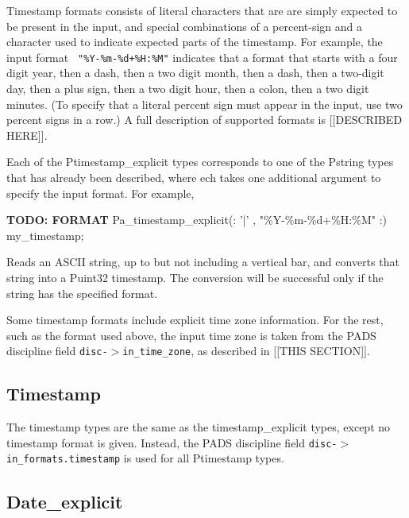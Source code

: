 Timestamp formats consists of literal characters that are are simply
expected to be present in the input, and special combinations of a
percent-sign and a character used to indicate expected parts of the
timestamp.  For example, the input format {\tt
"\%Y-\%m-\%d+\%H:\%M"} indicates that a format that starts with a
four digit year, then a dash, then a two digit month, then a dash,
then a two-digit day, then a plus sign, then a two digit hour, then a
colon, then a two digit minutes.  (To specify that a literal percent
sign must appear in the input, use two percent signs in a row.)  A
full description of supported formats is [[DESCRIBED HERE]].

Each of the Ptimestamp\_explicit types corresponds to one of the Pstring
types that has already been described, where ech takes one additional argument
to specify the input format.  For example,
\begin{tinycodeaux}{\leftmargin=0in}
{\bf TODO: FORMAT }
Pa\_timestamp\_explicit(: '|' , "\%Y-\%m-\%d+\%H:\%M" :) my\_timestamp;
\end{tinycodeaux}
Reads an ASCII string, up to but not including a vertical bar, and
converts that string into a Puint32 timestamp.  The conversion will be
successful only if the string has the specified format.

Some timestamp formats include explicit time zone information.  For
the rest, such as the format used above, the input time zone is taken
from the PADS discipline field {\tt disc-$>$in\_time\_zone}, as
described in [[THIS SECTION]].

\subsection{Timestamp}

\aedBegin{}
\aedEnd{}

The timestamp types are the same as the timestamp\_explicit types,
except no timestamp format is given.  Instead, the PADS
discipline field {\tt disc-$>$in\_formats.timestamp} is used
for all Ptimestamp types.

\subsection{Date\_explicit}

\aedBegin{}
\aedEnd{}

